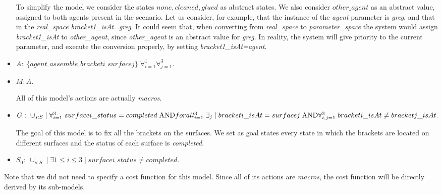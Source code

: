 \begin{itemize}
		To simplify the model we consider the states $none,cleaned,glued$ as abstract states. We also consider $other\_agent$ as an abstract value, assigned to both agents present in the scenario. Let us consider, for example, that the instance of the \textit{agent} parameter is \textit{greg}, and that in the \textit{real\_space} \textit{bracket1\_isAt=greg}. It could seem that, when converting from \textit{real\_space} to \textit{parameter\_space} the system would assign \textit{bracket1\_isAt} to \textit{other\_agent}, since \textit{other\_agent} is an abstract value for \textit{greg}. In reality, the system will give priority to the current parameter, and execute the conversion properly, by setting \textit{bracket1\_isAt=agent}. 
	\item $A:\;\{agent\_assemble\_bracketi\_surfacej\}\;\forall_{i=1}^1 \forall_{j=1}^3$.
	\item $M: A$.

	All of this model's actions are actually \textit{macros}.
	\item $G:\; \cup_{s:S}\; |\; \forall_{i=1}^3\; surfacei\_status=completed\;\text{AND}\;\\
	forall_{i=1}^3\;\exists_{j}\;|\;bracketi\_isAt=surfacej\; \text{AND} \\
	\forall_{i,j=1}^3\; bracketi\_isAt \neq bracketj\_isAt.$

	The goal of this model is to fix all the brackets on the surfaces. We set as goal states every state in which the brackets are located on different surfaces and the status of each surface is \textit{completed}. 
	\item $S_0:\; \cup_{s:S}\;|\; \exists{1\leq i \leq 3}\; |\; surfacei\_status \neq completed$.

\end{itemize}

Note that we did not need to specify a cost function for this model. Since all of its actions are \textit{macros}, the cost function will be directly derived by its sub-models.

